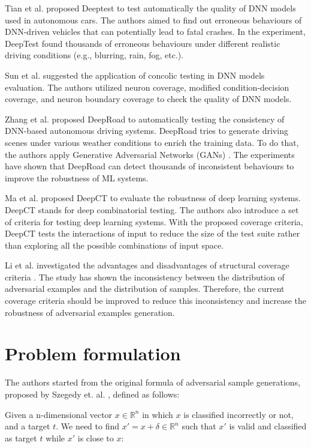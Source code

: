\documentclass[12pt]{article}
\begin{document}
Tian et al. proposed Deeptest \cite{deeptest} to test automatically the quality of DNN models used in autonomous cars. The authors aimed to find out erroneous behaviours of DNN-driven vehicles that can potentially lead to fatal crashes. In the experiment, DeepTest found thousands of erroneous behaviours under different realistic driving conditions (e.g., blurring, rain, fog, etc.).

Sun et al. \cite{concolic-testing} suggested the application of concolic testing in DNN models evaluation. The authors utilized neuron coverage, modified condition-decision coverage, and neuron boundary coverage to check the quality of DNN models.

Zhang et al. proposed DeepRoad \cite{deeproad} to automatically testing the consistency of DNN-based autonomous driving systems. DeepRoad tries to generate driving scenes under various weather conditions to enrich the training data. To do that, the authors apply Generative Adversarial Networks (GANs) \cite{gan}. The experiments have shown that DeepRoad can detect thousands of inconsistent behaviours to improve the robustness of ML systems.

Ma et al. proposed DeepCT \cite{deepct} to evaluate the robustness of deep learning systems. DeepCT stands for deep combinatorial testing. The authors also introduce a set of criteria for testing deep learning systems. With the proposed coverage criteria, DeepCT tests the interactions of input to reduce the size of the test suite rather than exploring all the possible combinations of input space.

Li et al. investigated the advantages and disadvantages of structural coverage criteria \cite{coverage-limiation}. The study has shown the inconsistency between the distribution of adversarial examples and the distribution of samples. Therefore, the current coverage criteria should be improved to reduce this inconsistency and increase the robustness of adversarial examples generation.

\section{Problem formulation}

The authors started from the original formula of adversarial sample generations, proposed by Szegedy et. al. \cite{42503}, defined as follows:

Given a n-dimensional vector $x \in \mathbb{R}^n$ in which $x$ is classified incorrectly or not, and a target $t$. We need to find $x' = x + \delta \in \mathbb{R}^n$ such that $x'$ is valid and classified as target $t$ while $x'$ is close to $x$:
\end{document}
